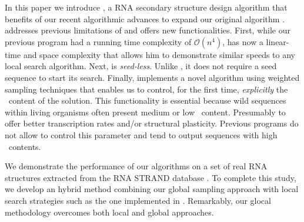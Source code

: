 In this paper we introduce \ourprog, a RNA secondary structure design algorithm that benefits of our recent algorithmic advances \cite{Reinharz:2013aa} to expand our original \RNAensign algorithm \cite{Levin:2012kx}. \ourprog addresses previous limitations of \RNAensign and offers new functionalities. First, while our previous program had a running time complexity of $\mathcal{O}(n^4)$, \ourprog has now a linear-time and space complexity that allows him to demonstrate similar speeds to any local search algorithm. Next, \ourprog is \textit{seed-less}. Unlike \RNAensign, it does not require a seed sequence to start its search. Finally, \ourprog implements a novel algorithm using weighted sampling techniques \cite{Bodini2010} that enables us to control, for the first time, \textit{explicitly} the \gc~content of the solution. This functionality is essential because wild sequences within living organisms often present medium or low \gc~content. Presumably to offer better transcription rates and/or structural plasticity. Previous programs do not allow to control this parameter and tend to output sequences with high \gc~contents. 

We demonstrate the performance of our algorithms on a set of real RNA structures extracted from the \textsf{RNA STRAND} database \cite{andronescu2008rna}. To complete this study, we develop an hybrid method combining our global sampling approach with local search strategies such as the one implemented in \RNAinverse. Remarkably, our glocal methodology overcomes both local and global approaches.